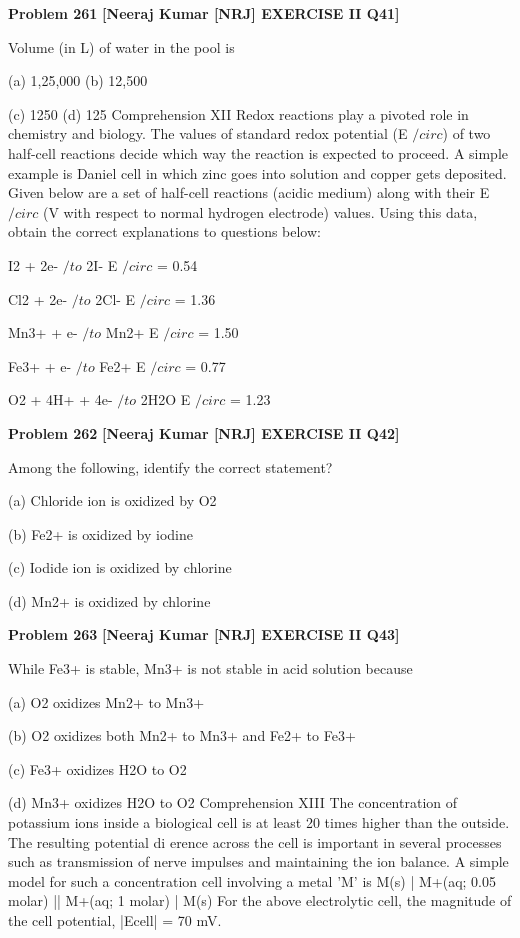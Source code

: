 \begin{problembox}
\textbf{Problem 261} \hfill \textbf{[Neeraj Kumar [NRJ] EXERCISE II Q41]}
\label{q:ext-nrj_all_questions-261}

Volume (in L) of water in the pool is
 
 (a) 1,25,000 
(b) 12,500
 
 (c) 1250 
(d) 125
Comprehension XII
Redox reactions play a pivoted role in chemistry and biology. The values of standard redox potential (E $/circ$) of two half-cell 
reactions decide which way the reaction is expected to proceed. A simple example is Daniel cell in which zinc goes into 
solution and copper gets deposited. Given below are a set of half-cell reactions (acidic medium) along with their E $/circ$ (V 
with respect to normal hydrogen electrode) values. Using this data, obtain the correct explanations to questions below:
 
 I2 + 2e- $/to$ 2I- 
E $/circ$ = 0.54
 
 Cl2 + 2e- $/to$ 2Cl- 
E $/circ$ = 1.36
 
 Mn3+ + e- $/to$ Mn2+ 
E $/circ$ = 1.50
 
 Fe3+ + e- $/to$ Fe2+ 
E $/circ$ = 0.77
 
 O2 + 4H+ + 4e- $/to$ 2H2O 
E $/circ$ = 1.23
\end{problembox}

\begin{problembox}
\textbf{Problem 262} \hfill \textbf{[Neeraj Kumar [NRJ] EXERCISE II Q42]}
\label{q:ext-nrj_all_questions-262}

Among the following, identify the correct 
statement?
 
 (a) Chloride ion is oxidized by O2
 
 (b) Fe2+ is oxidized by iodine
 
 (c) Iodide ion is oxidized by chlorine
 
 (d) Mn2+ is oxidized by chlorine
\end{problembox}

\begin{problembox}
\textbf{Problem 263} \hfill \textbf{[Neeraj Kumar [NRJ] EXERCISE II Q43]}
\label{q:ext-nrj_all_questions-263}

While Fe3+ is stable, Mn3+ is not stable in acid 
solution because
 
 (a) O2 oxidizes Mn2+ to Mn3+
 
 (b)  O2 oxidizes both Mn2+ to Mn3+ and Fe2+ to 
Fe3+
 
 (c) Fe3+ oxidizes H2O to O2
 
 (d) Mn3+ oxidizes H2O to O2
Comprehension XIII
The concentration of potassium ions inside a biological cell is at least 20 times higher than the  outside. The resulting 
potential di  erence across the cell is important in several processes such as transmission of nerve impulses and maintaining 
the ion balance. A simple model for such a concentration cell involving a metal 'M' is
M(s) | M+(aq; 0.05 molar) || M+(aq; 1 molar) | M(s)
For the above electrolytic cell, the magnitude of the cell potential, |Ecell| = 70 mV.
\end{problembox}

